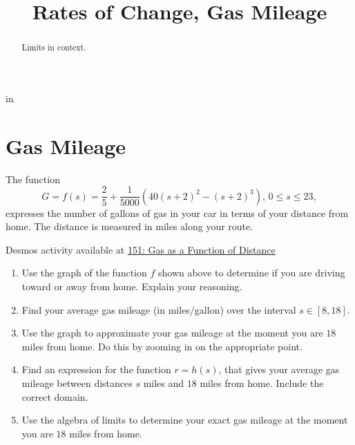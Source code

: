 \documentclass{ximera}
\title{Rates of Change, Gas Mileage}
\newcommand{\pskip}{\vskip 0.1 in}
\begin{document}
\begin{abstract}
Limits in context.
\end{abstract}
\maketitle


\pskip

\section{Gas Mileage} 

\begin{example} \label{Ex:9stghd8gfs}
The function 
\[
   G = f(s) = \frac{2}{5} +\frac{1}{5000} \left( 40(s+2)^2 - (s+2)^3 \right) , \, 0\leq s \leq 23 ,
\]
expresses the number of gallons of gas in your car in terms of your distance from home. The distance is measured in miles along your route. 

\begin{onlineOnly}
    \begin{center}
\end{center}
\end{onlineOnly}

Desmos activity available at
\href{https://www.desmos.com/calculator/xzkknfpkw3}{151: Gas as a Function of Distance}

\begin{enumerate}
\item Use the graph of the function $f$ shown above to determine if you are driving toward or away from home. Explain your reasoning.

\item Find your average gas mileage (in miles/gallon) over the interval $s \in [8,18]$.

\item Use the graph to approximate your gas mileage at the moment you are $18$ miles from home. Do this by zooming in on the appropriate point.

\item Find an expression for the function $r=h(s)$, that gives your average gas mileage between distances $s$ miles and $18$ miles from home. Include the correct domain.

\item Use the algebra of limits to determine your exact gas mileage at the moment you are $18$ miles from home.



\end{enumerate}
\end{example}
\end{document}
